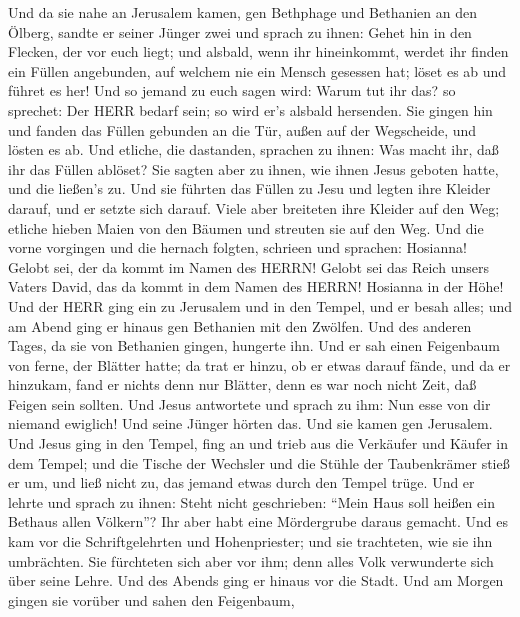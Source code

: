  Und da sie nahe an Jerusalem kamen, gen Bethphage und
Bethanien an den Ölberg, sandte er seiner Jünger zwei  und
sprach zu ihnen: Gehet hin in den Flecken, der vor euch liegt; und
alsbald, wenn ihr hineinkommt, werdet ihr finden ein Füllen angebunden,
auf welchem nie ein Mensch gesessen hat; löset es ab und führet es her!
 Und so jemand zu euch sagen wird: Warum tut ihr das? so
sprechet: Der HERR bedarf sein; so wird er's alsbald hersenden.
 Sie gingen hin und fanden das Füllen gebunden an die Tür,
außen auf der Wegscheide, und lösten es ab.  Und etliche,
die dastanden, sprachen zu ihnen: Was macht ihr, daß ihr das Füllen
ablöset?  Sie sagten aber zu ihnen, wie ihnen Jesus geboten
hatte, und die ließen's zu.  Und sie führten das Füllen zu
Jesu und legten ihre Kleider darauf, und er setzte sich darauf.
 Viele aber breiteten ihre Kleider auf den Weg; etliche
hieben Maien von den Bäumen und streuten sie auf den Weg. 
Und die vorne vorgingen und die hernach folgten, schrieen und sprachen:
Hosianna! Gelobt sei, der da kommt im Namen des HERRN! 
Gelobt sei das Reich unsers Vaters David, das da kommt in dem Namen des
HERRN! Hosianna in der Höhe!  Und der HERR ging ein zu
Jerusalem und in den Tempel, und er besah alles; und am Abend ging er
hinaus gen Bethanien mit den Zwölfen.  Und des anderen
Tages, da sie von Bethanien gingen, hungerte ihn.  Und er
sah einen Feigenbaum von ferne, der Blätter hatte; da trat er hinzu, ob
er etwas darauf fände, und da er hinzukam, fand er nichts denn nur
Blätter, denn es war noch nicht Zeit, daß Feigen sein sollten.
 Und Jesus antwortete und sprach zu ihm: Nun esse von dir
niemand ewiglich! Und seine Jünger hörten das.  Und sie
kamen gen Jerusalem. Und Jesus ging in den Tempel, fing an und trieb aus
die Verkäufer und Käufer in dem Tempel; und die Tische der Wechsler und
die Stühle der Taubenkrämer stieß er um,  und ließ nicht
zu, das jemand etwas durch den Tempel trüge.  Und er lehrte
und sprach zu ihnen: Steht nicht geschrieben: ``Mein Haus soll heißen
ein Bethaus allen Völkern''? Ihr aber habt eine Mördergrube daraus
gemacht.  Und es kam vor die Schriftgelehrten und
Hohenpriester; und sie trachteten, wie sie ihn umbrächten. Sie
fürchteten sich aber vor ihm; denn alles Volk verwunderte sich über
seine Lehre.  Und des Abends ging er hinaus vor die Stadt.
 Und am Morgen gingen sie vorüber und sahen den Feigenbaum,
